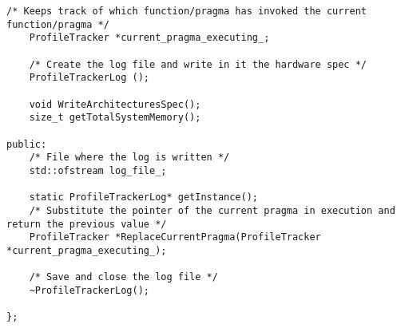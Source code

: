 \documentclass[a4paper,11pt,twoside]{book}
\begin{document}
\begin{lstlisting}[language=CCC, caption=profile\_tracker.h]
	/* Keeps track of which function/pragma has invoked the current function/pragma */
	ProfileTracker *current_pragma_executing_;

	/* Create the log file and write in it the hardware spec */
	ProfileTrackerLog ();

	void WriteArchitecturesSpec();
	size_t getTotalSystemMemory();    

public:
	/* File where the log is written */
	std::ofstream log_file_;

	static ProfileTrackerLog* getInstance();
	/* Substitute the pointer of the current pragma in execution and return the previous value */
	ProfileTracker *ReplaceCurrentPragma(ProfileTracker *current_pragma_executing_);

	/* Save and close the log file */
	~ProfileTrackerLog();

};
\end{lstlisting}
\end{document}
